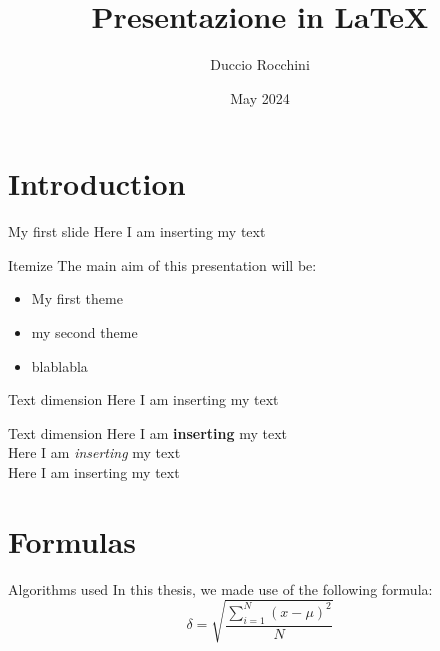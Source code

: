 \documentclass{beamer}
\title{Presentazione in LaTeX}
\author{Duccio Rocchini}
\date{May 2024}
\begin{document}
\maketitle


\section{Introduction}

\begin{frame}{My first slide}
    Here I am inserting my text
\end{frame}

\begin{frame}{Itemize}
The main aim of this presentation will be:
    \begin{itemize}
        \item My first theme
        \item \pause my second theme
        \item \pause blablabla
    \end{itemize}
\end{frame}


\begin{frame}{Text dimension}
    \scriptsize{Here I am inserting my text}
\end{frame}

\begin{frame}{Text dimension}
    Here I am \textbf{inserting} my text \\
    \bigskip
    Here I am \textit{inserting} my text \\
    \bigskip
    Here I am inserting my text 
\end{frame}

\section{Formulas}

\begin{frame}{Algorithms used}
In this thesis, we made use of the following formula:
\bigskip
    \begin{equation}
        \delta = \sqrt{\frac{\displaystyle\sum_{i=1}^{N}{(x - \mu)^2}}{N}}
    \end{equation}
\end{frame}
\end{document}
